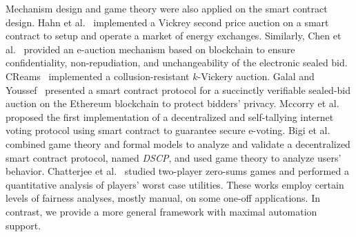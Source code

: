



Mechanism design and game theory were also applied on the smart contract design.
Hahn et al.~\cite{hahn2017smart} implemented a Vickrey second price auction on a smart contract to
setup and operate a market of energy exchanges.
Similarly, Chen et al.~\cite{chen2018blockchain} provided an e-auction mechanism based on
blockchain to ensure confidentiality, non-repudiation, and unchangeability of the electronic sealed
bid.
CReams~\cite{wu2018cream} implemented a collusion-resistant $k$-Vickery auction.
Galal and Youssef~\cite{galal2018succinctly} presented a smart contract protocol for a succinctly
verifiable sealed-bid auction on the Ethereum blockchain to protect bidders' privacy.
Mccorry et al.~\cite{mccorry2017smart} proposed the first implementation of a decentralized and
self-tallying internet voting protocol using smart contract to guarantee secure e-voting.
Bigi et al.~\cite{bigi2015validation} combined game theory and formal models to analyze and
validate a decentralized smart contract protocol, named \textit{DSCP}, and used game theory to
analyze users' behavior.
Chatterjee et al.~\cite{chatterjee2018quantitative} studied two-player zero-sums games and
performed a quantitative analysis of players' worst case utilities.
These works employ certain levels of fairness analyses, mostly manual, on some one-off applications.
In contrast, we provide a more general framework with maximal automation support.




